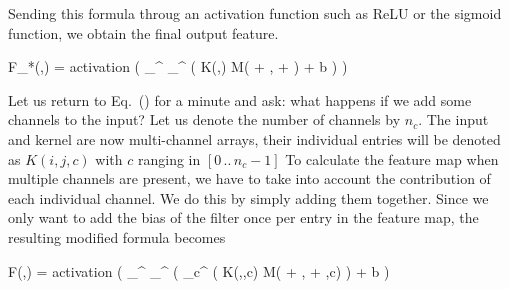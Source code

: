 Sending this formula throug an activation function such as ReLU or the sigmoid function, we obtain the final output feature.

\startplaceformula[reference=devel-feature-3]
\startformula
F_*(\color[red]{x},\color[red]{y})
= 
{\rm activation}
\left(
\sum_{\color[blue]{y}}^{} 
\sum_{\color[blue]{x}}^{} 
\Bigl(
K(\color[blue]{x},\color[blue]{y})
\cdot
M(\color[red]{x} + \color[blue]{x}, \color[red]{y} + \color[blue]{y})
+
b
\Bigr)
\right)
\stopformula
\stopplaceformula

\startsubsubsection[title=Multiple channels]
Let us return to Eq.~() for a minute and ask: what happens if we add some channels to the input?
Let us denote the number of channels by $n_c$.
The input and kernel are now multi-channel arrays, their individual entries will be denoted as $K(i,j,c)$ with $c$ ranging in $[0 \, .. \, n_c - 1]$
To calculate the feature map when multiple channels are present, we have to take into account the contribution of each individual channel.
We do this by simply adding them together.
Since we only want to add the bias of the filter once per entry in the feature map, the resulting modified formula becomes

\startplaceformula[reference=devel-feature-4]
\startformula
F(\color[red]{x},\color[red]{y})
=
{\rm activation}
\left( 
\sum_{\color[blue]{y}}^{}
\sum_{\color[blue]{x}}^{}
\left(
\sum_{c}^{}
\Bigl(
K(\color[blue]{x},\color[blue]{y},c)
\cdot
M(\color[red]{x} + \color[blue]{x}, \color[red]{y} + \color[blue]{y},c)
\right)
+
b
\right)
\stopformula
\stopplaceformula
\stopsubsubsection